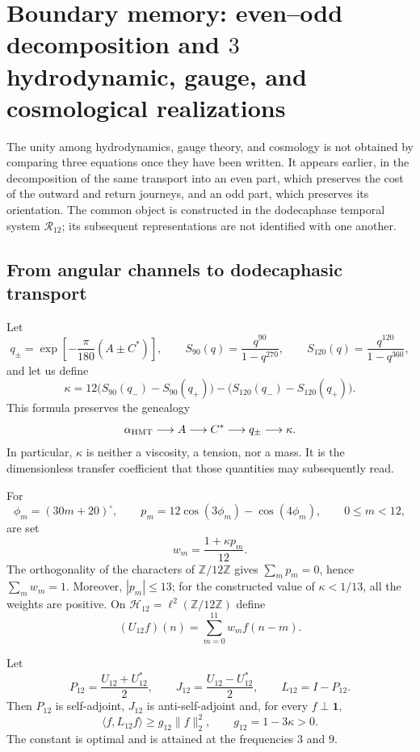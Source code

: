 \chapter{Boundary memory: even--odd decomposition and \(3\) hydrodynamic, gauge, and cosmological realizations}
\label{chap:memoria-tres-lecturas-rev6}

The unity among hydrodynamics, gauge theory, and cosmology is not obtained by
comparing three equations once they have been written.  It appears earlier, in the
decomposition of the same transport into an even part, which preserves the cost
of the outward and return journeys, and an odd part, which preserves its orientation.  The
common object is constructed in the dodecaphase temporal system \(\mathcal R_{12}\); its subsequent
representations are not identified with one another.

\section{From angular channels to dodecaphasic transport}

Let
\[
 q_\pm=\exp\!\left[-\frac{\pi}{180}(A\pm C^\ast)\right],
 \qquad
 S_{90}(q)=\frac{q^{90}}{1-q^{270}},
 \qquad
 S_{120}(q)=\frac{q^{120}}{1-q^{360}},
\]
and let us define
\[
 \kappa
 =12\bigl(S_{90}(q_-)-S_{90}(q_+)\bigr)
 -\bigl(S_{120}(q_-)-S_{120}(q_+)\bigr).
\]
This formula preserves the genealogy
\[
 \alpha_{\rm HMT}\longrightarrow A
 \longrightarrow C^\ast\longrightarrow q_\pm
 \longrightarrow\kappa.
\]
In particular, \(\kappa\) is neither a viscosity, a tension, nor a mass.  It is
the dimensionless transfer coefficient that those quantities may subsequently read.

For
\[
 \phi_m=(30m+20)^\circ,\qquad
 p_m=12\cos(3\phi_m)-\cos(4\phi_m),
 \qquad 0\leq m<12,
\]
are set
\[
 w_m=\frac{1+\kappa p_m}{12}.
\]
The orthogonality of the characters of
\(\mathbb Z/12\mathbb Z\) gives
\(\sum_m p_m=0\), hence \(\sum_mw_m=1\).  Moreover,
\(|p_m|\leq13\); for the constructed value of \(\kappa<1/13\), all the
weights are positive.  On
\(\mathcal H_{12}=\ell^2(\mathbb Z/12\mathbb Z)\) define
\[
 (U_{12}f)(n)=\sum_{m=0}^{11}w_mf(n-m).
\]

\begin{theorem}
\label{thm:reserva-dodecafasica-rev6}
Let
\[
 P_{12}=\frac{U_{12}+U_{12}^{\ast}}2,\qquad
 J_{12}=\frac{U_{12}-U_{12}^{\ast}}2,\qquad
 L_{12}=I-P_{12}.
\]
Then \(P_{12}\) is self-adjoint, \(J_{12}\) is
anti-self-adjoint and, for every \(f\perp\mathbf1\),
\[
 \boxed{\;
 \langle f,L_{12}f\rangle
 \geq g_{12}\|f\|_2^2,\qquad
 g_{12}=1-3\kappa>0.
 \;}
\]
The constant is optimal and is attained at the frequencies \(3\) and \(9\).
\end{theorem}

